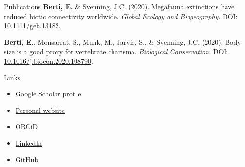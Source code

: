 \documentclass{resume} %
\begin{document}

\begin{rSection}{Publications}
\textbf{Berti, E.} \& Svenning, J.C. (2020). Megafauna extinctions have reduced biotic connectivity worldwide. \textit{Global Ecology and Biogeography}. DOI: \href{https://doi.org/10.1111/geb.13182}{10.1111/geb.13182}.

\textbf{Berti, E.}, Monsarrat, S., Munk, M., Jarvie, S., \& Svenning, J.C. (2020). Body size is a good proxy for vertebrate charisma. \textit{Biological Conservation}. DOI: \href{https://doi.org/10.1016/j.biocon.2020.108790}{10.1016/j.biocon.2020.108790}.
\end{rSection}

\begin{rSection}{Links}
\begin{minipage}{0.5\textwidth}
\begin{itemize}
    \item \href{https://scholar.google.com/citations?user=5KPh-oUAAAAJ&hl=en}{Google Scholar profile}
    \item \href{https://emilio-berti.github.io/}{Personal website}
    \item \href{https://orcid.org/0000-0001-9286-011X}{ORCiD}
\end{itemize}
\end{minipage}
\begin{minipage}{0.5\textwidth}
\begin{itemize}
    \item \href{https://www.linkedin.com/in/emilio-berti-55a348146}{LinkedIn}
    \item \href{https://github.com/emilio-berti}{GitHub}
\end{itemize}
\end{minipage}
\end{rSection}
\end{document}
